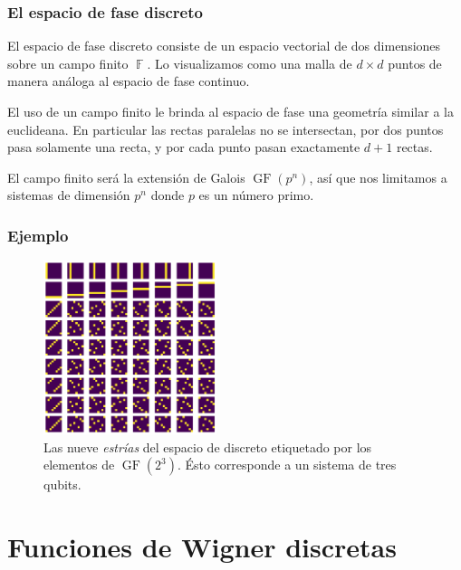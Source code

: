 \documentclass[10pt, spanish]{beamer}
\DeclareMathOperator{\F}{\mathbb{F}}
\DeclareMathOperator{\GF}{GF}
\begin{document}
  \begin{frame}
    \frametitle{El espacio de fase discreto}

    \begin{definition}
      El espacio de fase discreto consiste de un espacio
      vectorial de dos dimensiones sobre un campo finito
      $\F$. Lo visualizamos como una malla de $d \times d$ 
      puntos de manera análoga al espacio de fase continuo.
    \end{definition}

    \vspace{10pt}

    El uso de un campo finito le brinda al espacio de fase
    una geometría similar a la euclideana. En particular las
    rectas paralelas no se intersectan, por dos puntos pasa
    solamente una recta, y por cada punto pasan exactamente
    $d+1$ rectas.

    \vspace{10pt} 

    El campo finito será la extensión de Galois
    $\GF(p^{n})$, así que nos limitamos a sistemas de
    dimensión $p^{n}$ donde $p$ es un número primo.
  \end{frame}

  \begin{frame}
    \frametitle{Ejemplo}

    \begin{figure}[h]
      \centering
      \includegraphics[width=0.45\textwidth]{imgs/GF23.png}
      \caption{Las nueve \textit{estrías} del espacio de
      discreto etiquetado por los elementos de $\GF(2^{3})$.
      Ésto corresponde a un sistema de tres qubits.}
      \label{fig:GF23}
    \end{figure}
  \end{frame}

  \section{Funciones de Wigner discretas}
\end{document}
